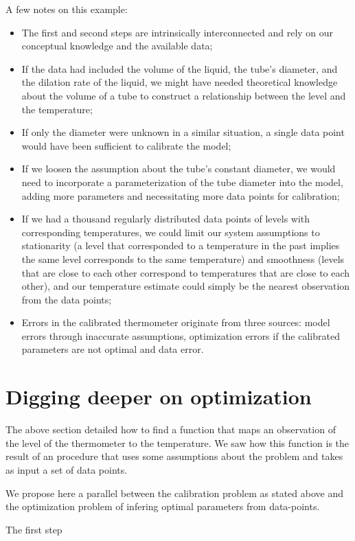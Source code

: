 \begin{bibunit}
A few notes on this example:
\begin{itemize}
\item The first and second steps are intrinsically interconnected and rely on our conceptual knowledge and the available data;
\item If the data had included the volume of the liquid, the tube's diameter, and the dilation rate of the liquid, we might have needed theoretical knowledge about the volume of a tube to construct a relationship between the level and the temperature;
\item If only the diameter were unknown in a similar situation, a single data point would have been sufficient to calibrate the model;
\item If we loosen the assumption about the tube's constant diameter, we would need to incorporate a parameterization of the tube diameter into the model, adding more parameters and necessitating more data points for calibration;
\item If we had a thousand regularly distributed data points of levels with corresponding temperatures, we could limit our system assumptions to stationarity (a level that corresponded to a temperature in the past implies the same level corresponds to the same temperature) and smoothness (levels that are close to each other correspond to temperatures that are close to each other), and our temperature estimate could simply be the nearest observation from the data points;
\item Errors in the calibrated thermometer originate from three sources: model errors through inaccurate assumptions, optimization errors if the calibrated parameters are not optimal and data error.
  \end{itemize}

\section{Digging deeper on optimization}
The above section detailed how to find a function that maps an observation of the level of the thermometer to the temperature.
We saw how this function is the result of an procedure that uses some assumptions about the problem and takes as input a set of data points.

We propose here a parallel between the calibration problem as stated above and the optimization problem of infering optimal parameters from data-points.

The first step 




\end{bibunit}
